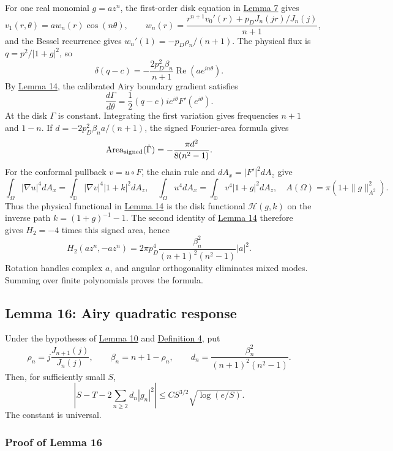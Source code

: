 \documentclass[11pt]{article}
\begin{document}
For one real monomial \(g=az^n\), the first-order disk equation in
\hyperref[lem-gradient-perturbation]{Lemma 7} gives \[
v_1(r,\theta)=a w_n(r)\cos(n\theta),
\qquad
w_n(r)=\frac{r^{n+1}v_0'(r)+p_DJ_n(jr)/J_n(j)}{n+1},
\] and the Bessel recurrence gives \(w_n'(1)=-p_D\rho_n/(n+1)\). The
physical flux is \(q=p^2/|1+g|^2\), so \[
\delta(q-c)=-\frac{2p_D^2\beta_n}{n+1}\operatorname{Re}(ae^{in\theta}).
\] By \hyperref[lem-airy-boundary-flux]{Lemma 14}, the calibrated Airy
boundary gradient satisfies \[
\frac{d\Gamma}{d\theta}=\frac12(q-c)i e^{i\theta}F'(e^{i\theta}).
\] At the disk \(\Gamma\) is constant. Integrating the first variation
gives frequencies \(n+1\) and \(1-n\). If \(d=-2p_D^2\beta_na/(n+1)\),
the signed Fourier-area formula gives \[
\operatorname{Area}_{\rm signed}(\dot\Gamma)=-\frac{\pi d^2}{8(n^2-1)}.
\] For the conformal pullback \(v=u\circ F\), the chain rule and
\(dA_x=|F'|^2dA_z\) give \[
\int_\Omega|\nabla u|^4dA_x=\int_{\mathbb D}|\nabla v|^4|1+k|^2dA_z,
\quad
\int_\Omega u^4dA_x=\int_{\mathbb D}v^4|1+g|^2dA_z,
\quad
A(\Omega)=\pi(1+\|g\|_{A^2}^2).
\] Thus the physical functional in
\hyperref[lem-airy-boundary-flux]{Lemma 14} is the disk functional
\(\mathscr H(g,k)\) on the inverse path \(k=(1+g)^{-1}-1\). The second
identity of \hyperref[lem-airy-boundary-flux]{Lemma 14} therefore gives
\(H_2=-4\) times this signed area, hence \[
H_2(az^n,-az^n)=2\pi p_D^4\frac{\beta_n^2}{(n+1)^2(n^2-1)}|a|^2.
\] Rotation handles complex \(a\), and angular orthogonality eliminates
mixed modes. Summing over finite polynomials proves the formula.

\subsection{Lemma 16: Airy quadratic
response}\label{lem-airy-quadratic-response}

Under the hypotheses of \hyperref[lem-inverse-energy]{Lemma 10} and
\hyperref[def-conformal-data]{Definition 4}, put \[
\rho_n=j\frac{J_{n+1}(j)}{J_n(j)},
\qquad \beta_n=n+1-\rho_n,
\qquad d_n=\frac{\beta_n^2}{(n+1)^2(n^2-1)}.
\] Then, for sufficiently small \(S\), \[
\left|S-T-2\sum_{n\ge2}d_n|g_n|^2\right|
\le C S^{3/2}\sqrt{\log(e/S)}.
\] The constant is universal.

\subsubsection{Proof of Lemma
16}\label{proof-lem-airy-quadratic-response}
\end{document}
